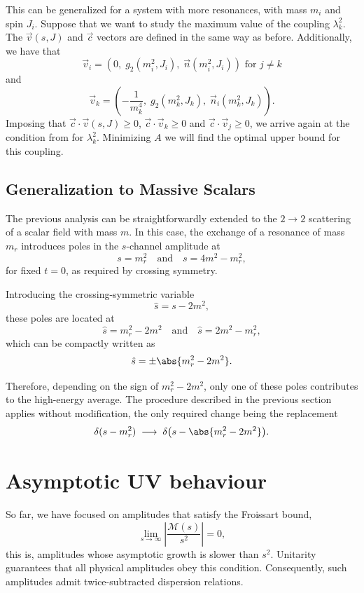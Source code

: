 This can be generalized for a system with more resonances, with mass $m_i$ and spin $J_i$. Suppose that we want to study the maximum value of the coupling $\lambda_k^2$.  The $\vec{v}(s,J)$ and $\vec{c}$ vectors are defined in the same way as before. Additionally, we have that 
\begin{equation}
    \vec{v}_i = \left(0, \; g_2(m_i^2,J_i),  \; \vec{n}(m_i^2, J_i) \right) \text{ for } j \neq k
\end{equation}
and 
\begin{equation}
    \vec{v}_k = \left(-\frac{1}{m_k^4}, \; g_2(m_k^2,J_k),  \; \vec{n}_i(m_k^2, J_k) \right).
\end{equation}
Imposing that $\vec{c} \cdot \vec{v}(s,J) \geq 0$, $\vec{c} \cdot \vec{v}_k \geq 0$ and $\vec{c} \cdot \vec{v}_j \geq 0$, we arrive again at the condition from  for $\lambda_k^2$. Minimizing $A$ we will find the optimal upper bound for this coupling.
\subsection{Generalization to Massive Scalars}

The previous analysis can be straightforwardly extended to the $2 \rightarrow 2$ scattering of a scalar field with mass $m$. In this case, the exchange of a resonance of mass $m_r$ introduces poles in the $s$-channel amplitude at
\[
s = m_r^2
\quad \text{and} \quad
s = 4m^2 - m_r^2,
\]
for fixed $t = 0$, as required by crossing symmetry.

Introducing the crossing-symmetric variable
\[
\hat{s} = s - 2m^2,
\]
these poles are located at
\[
\hat{s} = m_r^2 - 2m^2
\quad \text{and} \quad
\hat{s} = 2m^2 - m_r^2,
\]
which can be compactly written as
\[
\hat{s} = \pm \abs{m_r^2 - 2m^2}.
\]

Therefore, depending on the sign of $m_r^2 - 2m^2$, only one of these poles contributes to the high-energy average. The procedure described in the previous section applies without modification, the only required change being the replacement
\[
\delta(s - m_r^2) \;\longrightarrow\; 
\delta\big(s - \abs{m_r^2 - 2m^2}\big).
\]


\section{Asymptotic UV behaviour}

So far, we have focused on amplitudes that satisfy the Froissart bound,
\begin{equation}
\lim_{s \to \infty} \left|\frac{\mathcal{M}(s)}{s^{2}}\right| = 0,
\end{equation}
this is, amplitudes whose asymptotic growth is slower than $s^2$. Unitarity guarantees that all physical amplitudes obey this condition. Consequently, such amplitudes admit twice-subtracted dispersion relations.

